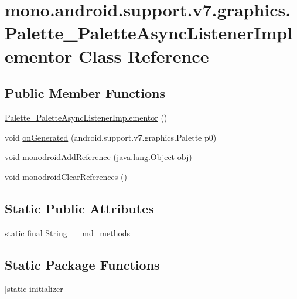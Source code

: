 \hypertarget{classmono_1_1android_1_1support_1_1v7_1_1graphics_1_1_palette___palette_async_listener_implementor}{
\section{mono.android.support.v7.graphics.Palette\_\-PaletteAsyncListenerImplementor Class Reference}
\label{classmono_1_1android_1_1support_1_1v7_1_1graphics_1_1_palette___palette_async_listener_implementor}
}
\subsection*{Public Member Functions}
\begin{CompactItemize}
\item 
\hyperlink{classmono_1_1android_1_1support_1_1v7_1_1graphics_1_1_palette___palette_async_listener_implementor_f78f10665c82470b7b63e6e76b37baef}{Palette\_\-PaletteAsyncListenerImplementor} ()
\item 
void \hyperlink{classmono_1_1android_1_1support_1_1v7_1_1graphics_1_1_palette___palette_async_listener_implementor_ef65b1075bdc583611199f2463b624fa}{onGenerated} (android.support.v7.graphics.Palette p0)
\item 
void \hyperlink{classmono_1_1android_1_1support_1_1v7_1_1graphics_1_1_palette___palette_async_listener_implementor_ac57918874a612b82f55bb3df578a397}{monodroidAddReference} (java.lang.Object obj)
\item 
void \hyperlink{classmono_1_1android_1_1support_1_1v7_1_1graphics_1_1_palette___palette_async_listener_implementor_2a340e867954054f32d2325589fc9606}{monodroidClearReferences} ()
\end{CompactItemize}
\subsection*{Static Public Attributes}
\begin{CompactItemize}
\item 
static final String \hyperlink{classmono_1_1android_1_1support_1_1v7_1_1graphics_1_1_palette___palette_async_listener_implementor_da8e3e98757fa63aa1e244817d49fc5d}{\_\-\_\-md\_\-methods}
\end{CompactItemize}
\subsection*{Static Package Functions}
\begin{CompactItemize}
\item 
\hyperlink{classmono_1_1android_1_1support_1_1v7_1_1graphics_1_1_palette___palette_async_listener_implementor_bc364a81bc0c17b556b94009ccf3348b}{\mbox{[}static initializer\mbox{]}}
\end{CompactItemize}
